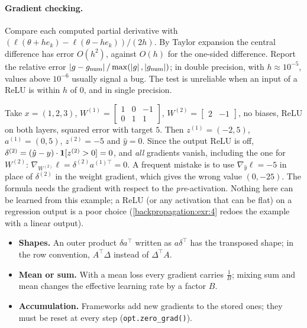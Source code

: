 \begin{notechapter}
\paragraph{Gradient checking.} Compare each computed partial derivative with
$(\ell(\theta + he_k) - \ell(\theta - he_k))/(2h)$. By Taylor expansion the central difference has error $O(h^2)$, against
$O(h)$ for the one-sided difference. Report the relative error
$\left|g - g_{\mathrm{num}}\right|/\max(\left|g\right|, \left|g_{\mathrm{num}}\right|)$; in double precision, with $h\approx10^{-5}$, values above $10^{-6}$ usually signal a
bug. The test is unreliable when an input of a ReLU is within $h$ of $0$, and in single
precision.

\begin{pitfall}
Take $x = (1,2,3)$, $W^{(1)} = \begin{bmatrix}1&0&-1\\0&1&1\end{bmatrix}$, $W^{(2)} = \begin{bmatrix}2 & -1\end{bmatrix}$, no biases, ReLU on both
layers, squared error with target $5$. Then $z^{(1)} = (-2, 5)$, $a^{(1)} = (0,5)$, $z^{(2)} = -5$ and $\hat y = 0$. Since
the output ReLU is off, $\delta^{(2)} = (\hat y - y)\cdot\mathbf{1}[z^{(2)}>0] = 0$, and \emph{all} gradients vanish, including the one
for $W^{(2)}$: $\nabla_{W^{(2)}}\ell = \delta^{(2)}a^{(1)\top} = 0$. A frequent mistake is to use $\nabla_{\hat y}\ell = -5$ in place of $\delta^{(2)}$ in the
weight gradient, which gives the wrong value $(0,-25)$. The formula needs the gradient with
respect to the \emph{pre}-activation. Nothing here can be learned from this example; a ReLU
(or any activation that can be flat) on a regression output is a poor choice
(\cref{backpropagation:exr:4} redoes the example with a linear output).
\end{pitfall}

\begin{itemize}
  \item \textbf{Shapes.} An outer product $\delta a^\top$ written as $a\delta^\top$ has the transposed shape; in the
        row convention, $A^\top\Delta$ instead of $\Delta^\top A$.
  \item \textbf{Mean or sum.} With a mean loss every gradient carries $\frac1B$; mixing sum and mean
        changes the effective learning rate by a factor $B$.
  \item \textbf{Accumulation.} Frameworks add new gradients to the stored ones; they must be
        reset at every step (\texttt{opt.zero\_grad()}).
\end{itemize}


\end{notechapter}
